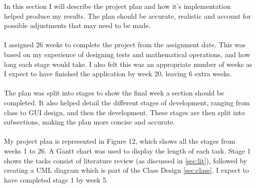 \documentclass[final]{cmpreport}
\begin{document}
	In this section I will describe the project plan and how it's implementation helped produce my results. The plan should be accurate, realistic and account for possible adjustments that may need to be made.\\
	\\I assigned 26 weeks to complete the project from the assignment date. This was based on my experience of designing tests and mathematical operations, and how long each stage would take. I also felt this was an appropriate number of weeks as I expect to have finished the application by week 20, leaving 6 extra weeks.\\
	\\The plan was split into stages to show the final week a section should be completed. It also helped detail the different stages of development, ranging from class to GUI design, and then the development. These stages are then split into subsections, making the plan more concise and accurate. \\
	\\My project plan is represented in Figure 12, which shows all the stages from weeks 1 to 26. A Gantt chart was used to display the length of each task. Stage 1 shows the tasks consist of literature review (as discussed in \ref{sec:lit}), followed by creating a UML diagram which is part of the Class Design \ref{sec:class}. I expect to have completed stage 1 by week 5.\\
	\renewcommand\sfdefault{phv}
	\renewcommand\mddefault{mc}
	\renewcommand\bfdefault{bc}
	\sffamily
\end{document}

